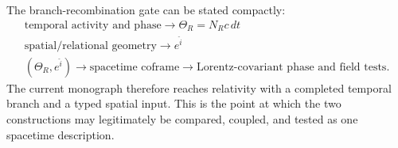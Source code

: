 The branch-recombination gate can be stated compactly:
\[
\boxed{
\begin{array}{c}
\text{temporal activity and phase}
\longrightarrow
\Theta_R=N_Rc\,dt\\[2mm]
\text{spatial/relational geometry}
\longrightarrow
e^{\hat i}\\[2mm]
(\Theta_R,e^{\hat i})
\longrightarrow
\text{spacetime coframe}
\longrightarrow
\text{Lorentz-covariant phase and field tests}.
\end{array}}
\]
The current monograph therefore reaches relativity with a completed temporal branch and a typed spatial input. This is the point at which the two constructions may legitimately be compared, coupled, and tested as one spacetime description.
